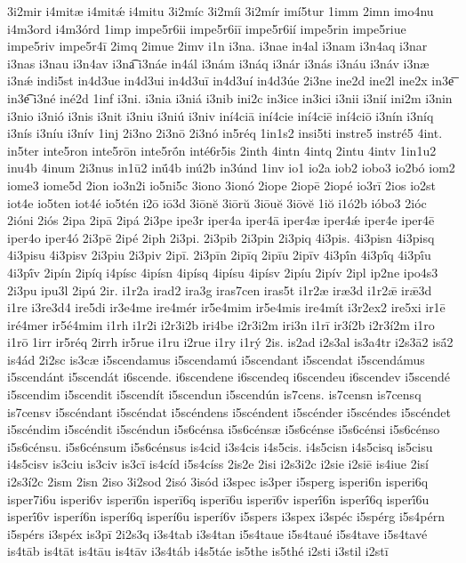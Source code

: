 {3i2mir
i4mitæ
i4mitǽ
i4mitu
3i2míc
3i2míi
3i2mír
imí5tur
1imm
2imn
imo4nu
i4m3ord
i4m3órd
1imp
impe5r6ii
impe5r6iī
impe5r6ií
impe5rin
impe5riue
impe5riv
impe5r4ī
2imq
2imue
2imv
i1n
i3na.
i3nae
in4al
i3nam
i3n4aq
i3nar
i3nas
i3nau
i3n4av
i3na͡
i3náe
in4ál
i3nám
i3náq
i3nár
i3nás
i3náu
i3náv
i3næ
i3nǽ
indi5st
in4d3ue
in4d3ui
in4d3uī
in4d3uí
in4d3úe
2i3ne
ine2d
ine2l
ine2x
in3e͞
in3e͡
i3né
iné2d
1inf
i3ni.
i3nia
i3niá
i3nib
ini2c
in3ice
in3ici
i3nii
i3nií
ini2m
i3nin
i3nio
i3nió
i3nis
i3nit
i3niu
i3niú
i3niv
iní4ciā
iní4cie
iní4ciē
iní4ciō
i3nín
i3níq
i3nís
i3níu
i3nív
1inj
2i3no
2i3nō
2i3nó
in5réq
1in1s2
insi5ti
instre5
instré5
4int.
in5ter
inte5ron
inte5rōn
inte5rṓn
inté6r5is
2inth
4intn
4intq
2intu
4intv
1in1u2
inu4b
4inum
2i3nus
in1ū2
inū́4b
inú2b
in3únd
1inv
io1
io2a
iob2
iobo3
io2bó
iom2
iome3
iome5d
2ion
io3n2i
io5ni5c
3iono
3ionó
2iope
2iopē
2iopé
io3rī
2ios
io2st
iot4e
io5ten
iot4é
io5tén
i2ō
iō3d
3iōnĕ
3iōrŭ
3iōuĕ
3iōvĕ
1iŏ
i1ó2b
ióbo3
2ióc
2ióni
2iós
2ipa
2ipā
2ipá
2i3pe
ipe3r
iper4a
iper4ā
iper4æ
iper4ǽ
iper4e
iper4ē
iper4o
iper4ó
2i3pē
2ipé
2iph
2i3pi.
2i3pib
2i3pin
2i3piq
4i3pis.
4i3pisn
4i3pisq
4i3pisu
4i3pisv
2i3piu
2i3piv
2ipī.
2i3pīn
2ipīq
2ipīu
2ipīv
4i3pī́n
4i3pī́q
4i3pī́u
4i3pī́v
2ipín
2ipíq
i4písc
4ipísn
4ipísq
4ipísu
4ipísv
2ipíu
2ipív
2ipl
ip2ne
ipo4s3
2i3pu
ipu3l
2ipú
2ir.
i1r2a
irad2
ira3g
iras7cen
iras5t
i1r2æ
iræ3d
i1r2ǣ
irǣ3d
i1re
i3re3d4
ire5di
ir3e4me
ire4mér
ir5e4mim
ir5e4mis
ire4mít
i3r2ex2
ire5xi
ir1ē
iré4mer
ir5é4mim
i1rh
i1r2i
i2r3i2b
iri4be
i2r3i2m
iri3n
i1rī
ir3í2b
i2r3í2m
i1ro
i1rō
1irr
ir5réq
2irrh
ir5rue
i1ru
i2rue
i1ry
i1rý
2is.
is2ad
i2s3al
is3a4tr
i2s3ā2
isā́2
is4ád
2i2sc
is3cæ
i5scendamus
i5scendamú
i5scendant
i5scendat
i5scendámus
i5scendánt
i5scendát
i6scende.
i6scendene
i6scendeq
i6scendeu
i6scendev
i5scendé
i5scendim
i5scendit
i5scendít
i5scendun
i5scendún
is7cens.
is7censn
is7censq
is7censv
i5scéndant
i5scéndat
i5scéndens
i5scéndent
i5scénder
i5scéndes
i5scéndet
i5scéndim
i5scéndit
i5scéndun
i5s6cénsa
i5s6cénsæ
i5s6cénse
i5s6cénsi
i5s6cénso
i5s6cénsu.
i5s6cénsum
i5s6cénsus
is4cid
i3s4cis
i4s5cis.
i4s5cisn
i4s5cisq
is5cisu
i4s5cisv
is3ciu
is3civ
is3cī
is4cíd
i5s4císs
2is2e
2isi
i2s3i2c
i2sie
i2siē
is4iue
2isí
i2s3í2c
2ism
2isn
2iso
3i2sod
2isó
3isód
i3spec
is3per
i5sperg
isperi6n
isperi6q
isper7i6u
isperi6v
isperī6n
isperī6q
isperī6u
isperī6v
isperī́6n
isperī́6q
isperī́6u
isperī́6v
isperí6n
isperí6q
isperí6u
isperí6v
i5spers
i3spex
i3spéc
i5spérg
i5s4pérn
i5spérs
i3spéx
is3pī
2i2s3q
i3s4tab
i3s4tan
i5s4taue
i5s4taué
i5s4tave
i5s4tavé
is4tāb
is4tāt
is4tāu
is4tāv
i3s4táb
i4s5táe
is5the
is5thé
i2sti
i3stil
i2stī
}
